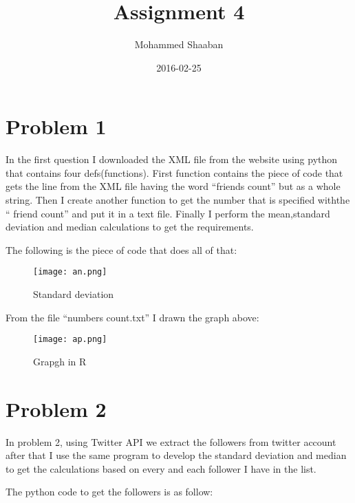 \documentclass{article}
\title{Assignment 4}
\date{2016-02-25}
\author{Mohammed Shaaban}
\begin{document}
  \maketitle
\section{Problem 1}\label{di:di}
In the first question I downloaded the XML file from the website using python that contains four defs(functions). First function contains the piece of code that gets the line from the XML file having the word ``friends count'' but as a whole string. Then I create another function to get the number that is specified withthe `` friend count'' and put it in a text file. Finally I perform the mean,standard deviation and median calculations to get the requirements.

The following is the piece of code that does all of that:






\begin{figure}
\centering
\texttt{[image: an.png]}
\caption{Standard deviation}
\label{fig:figq.png}
\end{figure}
\newpage
From the file ``numbers count.txt'' I drawn the graph above:
\begin{figure}
\centering
\texttt{[image: ap.png]}
\caption{Grapgh in R}
\label{fig:fiwg.png}
\end{figure}

\section{Problem 2}

In problem 2, using Twitter API we extract the followers from twitter account after that I use the same program to develop the standard deviation and median to get the calculations based on every and each follower I have in the list.

The python code to get the followers is as follow:

\end{document}
